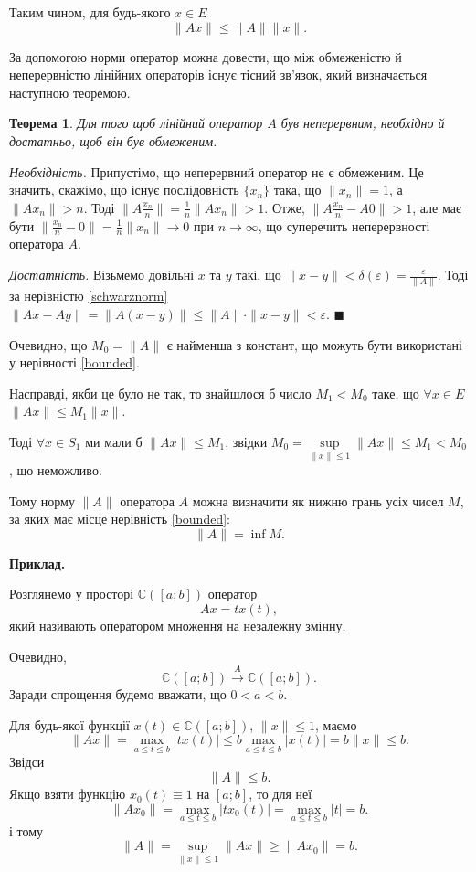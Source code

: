 \documentclass[14pt,twoside]{extreport}
\theoremstyle{mystyle}
\newtheorem{thm}{Теорема}
\renewenvironment{proof}{{\bfseries Доведення.}}{$\blacksquare$}
\numberwithin{equation}{chapter}
\newcommand{\cab}{\mathbb{C}([a; b])}
\begin{document}
Таким чином, для будь-якого $x \in E$
\begin{equation}\label{schwarznorm}
 \|Ax\|\leqslant \|A\|\|x\|.
\end{equation}

За допомогою норми оператор можна довести, що між обмеженістю й неперервністю лінійних операторів існує тісний зв'язок, який визначається наступною теоремою.

\begin{thm}
Для того щоб лінійний оператор $A$ був неперервним, необхідно й достатньо, щоб він був обмеженим.
\end{thm}
\begin{proof}
	\emph{Необхідність.}
Припустімо, що неперервний оператор не є обмеженим. Це значить, скажімо, що існує послідовність $\{x_n\}$ така, що $\|x_n\|=1$, а $\|Ax_n\|>n$. Тоді $\|A\frac{x_n}{n}\|=\frac{1}{n} \|Ax_n\| >1$. Отже, $\|A\frac{x_n}{n} - A0\| >1$, але має бути $\|\frac{x_n}{n} - 0\| = \frac{1}{n}\|x_n\| \to 0$ при $n\to \infty$, що суперечить неперервності оператора $A$.

\emph{Достатність.} Візьмемо довільні $x$ та $y$ такі, що $\|x-y\| < \delta (\varepsilon) = \frac{\varepsilon}{\|A\|}$. Тоді за нерівністю \eqref{schwarznorm} $\|Ax -Ay\| = \|A(x-y)\| \leqslant \|A\|\cdot\|x-y\|<\varepsilon$.
\end{proof}

Очевидно, що $M_0 = \|A\|$ є найменша з констант, що можуть бути використані у нерівності \eqref{bounded}.

Насправді, якби це було не так, то знайшлося б число $M_1 < M_0$ таке, що $\forall x \in E$ $\|Ax\| \leqslant M_1\|x\|$.

Тоді $\forall x\in S_1$ ми мали б $\|Ax\| \leqslant M_1$, звідки $M_0 = \sup\limits_{\|x\|\leqslant 1} \|Ax\| \leqslant M_1<M_0$, що неможливо.

Тому норму $\|A\|$ оператора $A$ можна визначити як нижню грань усіх чисел $M$, за яких має місце нерівність \eqref{bounded}:
\[
 \|A\|=\inf M.
\]

\textbf{Приклад.}

Розглянемо у просторі $\cab$ оператор
\[
Ax=tx(t),
\]
який називають оператором множення на незалежну змінну.

Очевидно,
\[
\cab \mathop{\to}\limits^{A} \cab.
\]
Заради спрощення будемо вважати, що $0 < a < b$.

Для будь-якої функції $x(t) \in \cab$, $\|x\|\leqslant 1$, маємо
\begin{equation}\label{exnorm1}
\|Ax\| = \max\limits_{a\leqslant t \leqslant b} |tx(t)|\leqslant b \max\limits_{a\leqslant t \leqslant b}|x(t)| = b \|x\|\leqslant b.
\end{equation}
Звідси
\[
\|A\| \leqslant b.
\]
Якщо взяти функцію $x_0(t)\equiv 1$ на $[a; b]$, то для неї
\[
\|Ax_0\| = \max\limits_{a\leqslant t \leqslant b} |tx_0(t)|=\max\limits_{a\leqslant t \leqslant b}|t| = b.
\]
і тому
\begin{equation}\label{exnorm2}
\|A\| = \sup_{\|x\| \leqslant 1} \|Ax\| \geqslant \|Ax_0\|=b.
\end{equation}
\end{document}
